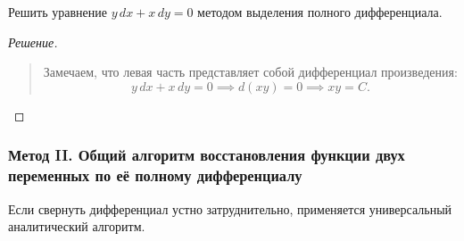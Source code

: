 \begin{example}
    Решить уравнение $y \, dx + x \, dy = 0$ методом выделения полного
    дифференциала.

    \begin{proof}[Решение]~\\
        \begin{quote}
            Замечаем, что левая часть представляет собой дифференциал
            произведения:
            \[
                y \, dx + x \, dy = 0 \implies d(x y) = 0 \implies x y = C.
            \]
        \end{quote}
    \end{proof}
\end{example}

\subsubsection{Метод II. Общий алгоритм восстановления функции двух переменных по её полному дифференциалу}

Если свернуть дифференциал устно затруднительно, применяется универсальный
аналитический алгоритм.

